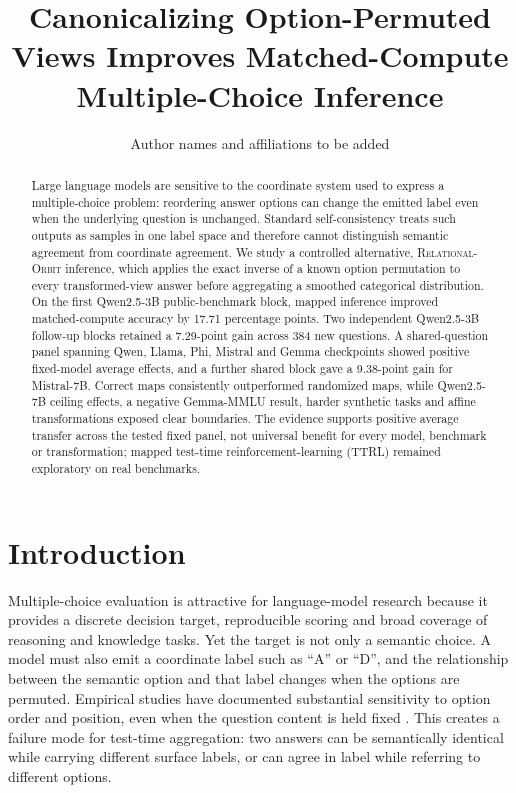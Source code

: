 \documentclass[11pt]{article}
\title{Canonicalizing Option-Permuted Views Improves Matched-Compute Multiple-Choice Inference}
\author{Author names and affiliations to be added}
\date{}
\newcommand{\ro}{\textsc{Relational-Orbit}}
\begin{document}
\maketitle

\begin{abstract}
 Large language models are sensitive to the coordinate system used to express a multiple-choice problem: reordering answer options can change the emitted label even when the underlying question is unchanged. Standard self-consistency treats such outputs as samples in one label space and therefore cannot distinguish semantic agreement from coordinate agreement. We study a controlled alternative, \ro{} inference, which applies the exact inverse of a known option permutation to every transformed-view answer before aggregating a smoothed categorical distribution. On the first Qwen2.5-3B public-benchmark block, mapped inference improved matched-compute accuracy by 17.71 percentage points. Two independent Qwen2.5-3B follow-up blocks retained a 7.29-point gain across 384 new questions. A shared-question panel spanning Qwen, Llama, Phi, Mistral and Gemma checkpoints showed positive fixed-model average effects, and a further shared block gave a 9.38-point gain for Mistral-7B. Correct maps consistently outperformed randomized maps, while Qwen2.5-7B ceiling effects, a negative Gemma-MMLU result, harder synthetic tasks and affine transformations exposed clear boundaries. The evidence supports positive average transfer across the tested fixed panel, not universal benefit for every model, benchmark or transformation; mapped test-time reinforcement-learning (TTRL) remained exploratory on real benchmarks.
\end{abstract}

\section{Introduction}

Multiple-choice evaluation is attractive for language-model research because it provides a discrete decision target, reproducible scoring and broad coverage of reasoning and knowledge tasks. Yet the target is not only a semantic choice. A model must also emit a coordinate label such as ``A'' or ``D'', and the relationship between the semantic option and that label changes when the options are permuted. Empirical studies have documented substantial sensitivity to option order and position, even when the question content is held fixed \citep{zheng2023selectors,pezeshkpour2024order}. This creates a failure mode for test-time aggregation: two answers can be semantically identical while carrying different surface labels, or can agree in label while referring to different options.
\end{document}
